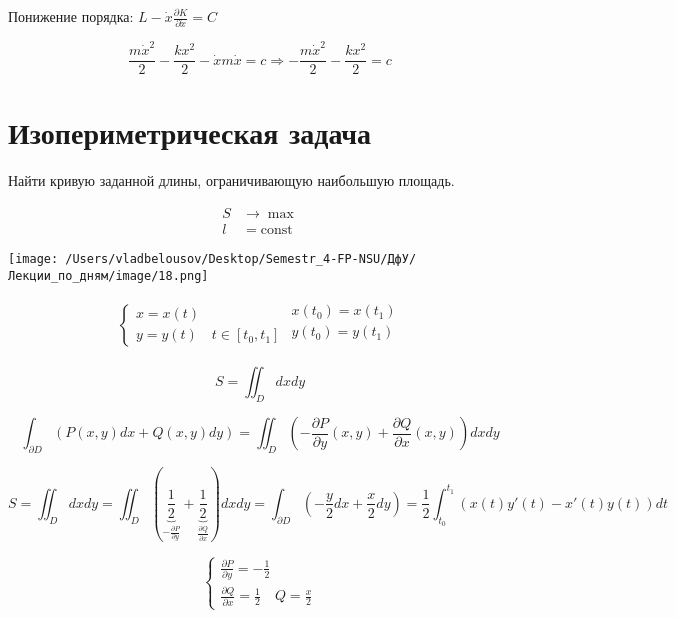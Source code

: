 \documentclass[12pt, a4paper]{report}
\begin{document}
Понижение порядка: \( \displaystyle  L - \dot{x } \frac{\partial K }{\partial  \dot{x} } = C  \) 

\[ \frac{m \dot{x }  ^2 }{2 } - \frac{k x ^2 }{2 } - \dot{x } m \dot{x } = c \Rightarrow -\frac{m \dot{ x } ^2 }{2 } - \frac{k x ^2  }{2}  =c   \] 

\section{Изопериметрическая задача }

Найти кривую заданной длины, ограничивающую наибольшую площадь.

\[ \begin{aligned}
    S &\to  \max  \\ 
    l &= \mathrm{const}  
\end{aligned} \] 

\begin{center}
    \texttt{[image: /Users/vladbelousov/Desktop/Semestr\_4-FP-NSU/ДфУ/Лекции\_по\_дням/image/18.png]}
\end{center}

\[\begin{aligned}
    \begin{cases}
        x = x(t) \\ 
        y = y(t) \quad  t \in [ t_0 ,t_1]
        \end{cases}
    \begin{aligned}
        x(t_0 )=x(t_1) \\ 
        y(t_0 )=y(t_1) \\  
    \end{aligned}
\end{aligned} \]

\[ S = \iint_D dx dy   \] 

\[ \int_{ \partial D} \left( P(x,y )dx +Q(x,y )dy  \right) =\iint _D \left( - \frac{\partial P }{ \partial  y } (x,y ) + \frac{\partial Q}{\partial x }(x,y)   \right) dx dy\] 

\[ S = \iint_D dx dy = \iint_D \left(\underbrace{ \frac{1}{2 }}_{- \frac{\partial  P}{\partial y} } + \underbrace{ \frac{1}{2 }}_{ \frac{\partial  Q}{\partial x} }       \right)dx dy = \int_{ \partial  D } \left(  - \frac{y}{2 } dx + \frac{x}{2 } dy \right)  =\frac{1}{2 } \int_{t_0 }^{t_1} (x(t )y ' (t )- x' (t )y (t))dt  \] 

\[ \begin{cases}
\frac{\partial P } {\partial y } = -\frac{1}{2 }  \quad   \\
\frac{\partial Q }{\partial x } = \frac{1}{2 } \quad  Q = \frac{x}{2}   
\end{cases} \] 
\end{document}
